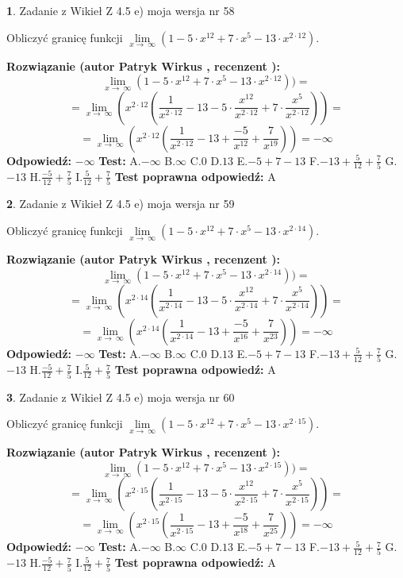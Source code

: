 \documentclass[12pt, a4paper]{article}
\theoremstyle{definition} %
\newtheorem{zad}{}
\newcommand{\zadStart}[1]{\begin{zad}#1\newline}
\newcommand{\zadStop}{\end{zad}}
\newcommand{\rozwStart}[2]{\noindent \textbf{Rozwiązanie (autor #1 , recenzent #2): }\newline}
\newcommand{\rozwStop}{\newline}
\newcommand{\odpStart}{\noindent \textbf{Odpowiedź:}\newline}
\newcommand{\odpStop}{\newline}
\newcommand{\testStart}{\noindent \textbf{Test:}\newline}
\newcommand{\testStop}{\newline}
\newcommand{\kluczStart}{\noindent \textbf{Test poprawna odpowiedź:}\newline}
\newcommand{\kluczStop}{\newline}
\begin{document}
\zadStart{Zadanie z Wikieł Z 4.5 e) moja wersja nr 58}



Obliczyć granicę funkcji  $\lim\limits_{x\to\ \infty}(1 - 5 \cdot x^{12}+7 \cdot x^{5}- 13 \cdot x^{2\cdot12})$.
\zadStop
\rozwStart{Patryk Wirkus}{}
$$\lim\limits_{x\to\ \infty}(1 - 5 \cdot x^{12}+7 \cdot x^{5}- 13 \cdot x^{2\cdot12}))=$$
$$=\lim\limits_{x\to\ \infty}(x^{2\cdot12}(\frac{1}{x^{2\cdot12}}-13 -5 \cdot \frac{x^{12}}{x^{2\cdot12}}+7 \cdot \frac{x^{5}}{x^{2\cdot12}}))=$$
$$=\lim\limits_{x\to\ \infty}(x^{2\cdot12}(\frac{1}{x^{2\cdot12}}-13 + \frac{-5}{x^{12}}+ \frac{7}{x^{19}}))=-\infty$$
\rozwStop
\odpStart
$-\infty$
\odpStop
\testStart
A.$-\infty$ B.$\infty$ C.$0$ D.$13$ E.$-5 + 7 - 13$
F.$-13+\frac{5}{12}+\frac{7}{5}$ G.$-13$
H.$\frac{-5}{12}+\frac{7}{5}$
I.$\frac{5}{12}+\frac{7}{5}$
\testStop
\kluczStart
A
\kluczStop



\zadStart{Zadanie z Wikieł Z 4.5 e) moja wersja nr 59}



Obliczyć granicę funkcji  $\lim\limits_{x\to\ \infty}(1 - 5 \cdot x^{12}+7 \cdot x^{5}- 13 \cdot x^{2\cdot14})$.
\zadStop
\rozwStart{Patryk Wirkus}{}
$$\lim\limits_{x\to\ \infty}(1 - 5 \cdot x^{12}+7 \cdot x^{5}- 13 \cdot x^{2\cdot14}))=$$
$$=\lim\limits_{x\to\ \infty}(x^{2\cdot14}(\frac{1}{x^{2\cdot14}}-13 -5 \cdot \frac{x^{12}}{x^{2\cdot14}}+7 \cdot \frac{x^{5}}{x^{2\cdot14}}))=$$
$$=\lim\limits_{x\to\ \infty}(x^{2\cdot14}(\frac{1}{x^{2\cdot14}}-13 + \frac{-5}{x^{16}}+ \frac{7}{x^{23}}))=-\infty$$
\rozwStop
\odpStart
$-\infty$
\odpStop
\testStart
A.$-\infty$ B.$\infty$ C.$0$ D.$13$ E.$-5 + 7 - 13$
F.$-13+\frac{5}{12}+\frac{7}{5}$ G.$-13$
H.$\frac{-5}{12}+\frac{7}{5}$
I.$\frac{5}{12}+\frac{7}{5}$
\testStop
\kluczStart
A
\kluczStop



\zadStart{Zadanie z Wikieł Z 4.5 e) moja wersja nr 60}



Obliczyć granicę funkcji  $\lim\limits_{x\to\ \infty}(1 - 5 \cdot x^{12}+7 \cdot x^{5}- 13 \cdot x^{2\cdot15})$.
\zadStop
\rozwStart{Patryk Wirkus}{}
$$\lim\limits_{x\to\ \infty}(1 - 5 \cdot x^{12}+7 \cdot x^{5}- 13 \cdot x^{2\cdot15}))=$$
$$=\lim\limits_{x\to\ \infty}(x^{2\cdot15}(\frac{1}{x^{2\cdot15}}-13 -5 \cdot \frac{x^{12}}{x^{2\cdot15}}+7 \cdot \frac{x^{5}}{x^{2\cdot15}}))=$$
$$=\lim\limits_{x\to\ \infty}(x^{2\cdot15}(\frac{1}{x^{2\cdot15}}-13 + \frac{-5}{x^{18}}+ \frac{7}{x^{25}}))=-\infty$$
\rozwStop
\odpStart
$-\infty$
\odpStop
\testStart
A.$-\infty$ B.$\infty$ C.$0$ D.$13$ E.$-5 + 7 - 13$
F.$-13+\frac{5}{12}+\frac{7}{5}$ G.$-13$
H.$\frac{-5}{12}+\frac{7}{5}$
I.$\frac{5}{12}+\frac{7}{5}$
\testStop
\kluczStart
A
\kluczStop
\end{document}
